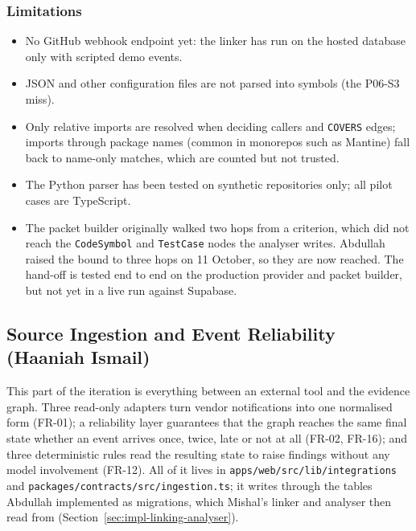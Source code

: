 \subsubsection{Limitations}
\begin{itemize}
  \item No GitHub webhook endpoint yet: the linker has run on the hosted
        database only with scripted demo events.
  \item JSON and other configuration files are not parsed into symbols (the
        P06-S3 miss).
  \item Only relative imports are resolved when deciding callers and
        \texttt{COVERS} edges; imports through package names (common in
        monorepos such as Mantine) fall back to name-only matches, which are
        counted but not trusted.
  \item The Python parser has been tested on synthetic repositories only; all
        pilot cases are TypeScript.
  \item The packet builder originally walked two hops from a criterion, which
        did not reach the \texttt{CodeSymbol} and \texttt{TestCase} nodes the
        analyser writes. Abdullah raised the bound to three hops on 11 October,
        so they are now reached. The hand-off is tested end to end on the
        production provider and packet builder, but not yet in a live run
        against Supabase.
\end{itemize}

\subsection{Source Ingestion and Event Reliability (Haaniah Ismail)}
\label{sec:impl-ingestion}

This part of the iteration is everything between an external tool and the
evidence graph. Three read-only adapters turn vendor notifications into one
normalised form (FR-01); a reliability layer guarantees that the graph reaches
the same final state whether an event arrives once, twice, late or not at all
(FR-02, FR-16); and three deterministic rules read the resulting state to raise
findings without any model involvement (FR-12). All of it lives in
\texttt{apps/web/src/lib/integrations} and
\texttt{packages/contracts/src/ingestion.ts}; it writes through the tables
Abdullah implemented as
migrations, which Mishal's linker and analyser then read from
(Section~\ref{sec:impl-linking-analyser}).

